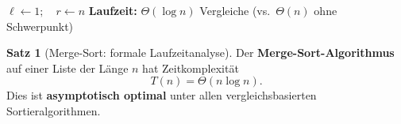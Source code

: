﻿\documentclass[a4paper,12pt]{report}
\theoremstyle{definition}
\newtheorem{satz}{Satz}
\begin{document}
\begin{algorithm}[H]
\DontPrintSemicolon
\caption{Binärsuche}\label{alg:binsearch}
$\ell \leftarrow 1;\quad r \leftarrow n$\;
\;
\BlankLine
\textbf{Laufzeit:} $\Theta(\log n)$ Vergleiche \quad (vs.\ $\Theta(n)$ ohne Schwerpunkt)
\end{algorithm}

\begin{satz}[Merge-Sort: formale Laufzeitanalyse]
    \label{satz:mergesort}
    Der \textbf{Merge-Sort-Algorithmus} auf einer Liste der Länge $n$
    hat Zeitkomplexität
    \[
        T(n) = \Theta(n \log n).
    \]
    Dies ist \textbf{asymptotisch optimal} unter allen
    vergleichsbasierten Sortieralgorithmen.
\end{satz}
\end{document}
